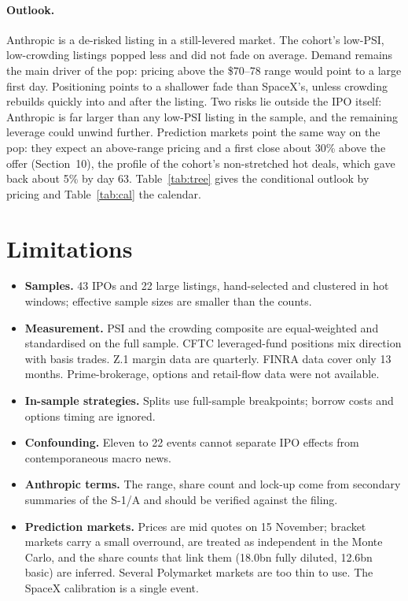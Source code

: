\documentclass[11pt]{article}
\begin{document}
\paragraph{Outlook.} Anthropic is a de-risked listing in a still-levered market. The cohort's low-PSI, low-crowding listings popped less and did not fade on average. Demand remains the main driver of the pop: pricing above the \$70--78 range would point to a large first day. Positioning points to a shallower fade than SpaceX's, unless crowding rebuilds quickly into and after the listing. Two risks lie outside the IPO itself: Anthropic is far larger than any low-PSI listing in the sample, and the remaining leverage could unwind further. Prediction markets point the same way on the pop: they expect an above-range pricing and a first close about 30\% above the offer (Section~10), the profile of the cohort's non-stretched hot deals, which gave back about 5\% by day 63. Table~\ref{tab:tree} gives the conditional outlook by pricing and Table~\ref{tab:cal} the calendar.





\section{Limitations}
\begin{itemize}
\item \textbf{Samples.} 43 IPOs and 22 large listings, hand-selected and clustered in hot windows; effective sample sizes are smaller than the counts.
\item \textbf{Measurement.} PSI and the crowding composite are equal-weighted and standardised on the full sample. CFTC leveraged-fund positions mix direction with basis trades. Z.1 margin data are quarterly. FINRA data cover only 13 months. Prime-brokerage, options and retail-flow data were not available.
\item \textbf{In-sample strategies.} Splits use full-sample breakpoints; borrow costs and options timing are ignored.
\item \textbf{Confounding.} Eleven to 22 events cannot separate IPO effects from contemporaneous macro news.
\item \textbf{Anthropic terms.} The range, share count and lock-up come from secondary summaries of the S-1/A and should be verified against the filing.
\item \textbf{Prediction markets.} Prices are mid quotes on 15 November; bracket markets carry a small overround, are treated as independent in the Monte Carlo, and the share counts that link them (18.0bn fully diluted, 12.6bn basic) are inferred. Several Polymarket markets are too thin to use. The SpaceX calibration is a single event.
\end{itemize}
\end{document}
